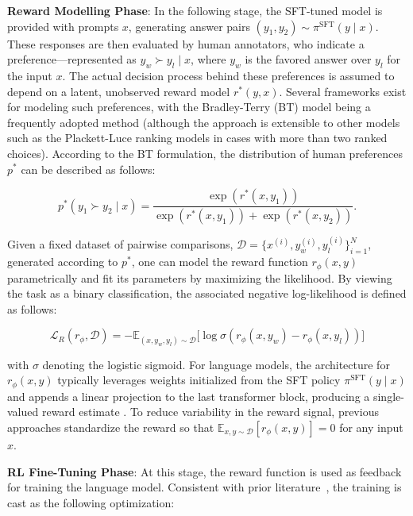 \textbf{Reward Modelling Phase}: In the following stage, the SFT-tuned model is provided with prompts $x$, generating answer pairs $(y_1, y_2)\sim \pi^\text{SFT}(y \mid x)$. These responses are then evaluated by human annotators, who indicate a preference—represented as $y_w\succ y_l \mid x$, where $y_w$ is the favored answer over $y_l$ for the input $x$. The actual decision process behind these preferences is assumed to depend on a latent, unobserved reward model $r^*(y, x)$. Several frameworks exist for modeling such preferences, with the Bradley-Terry (BT) model \cite{bradley1952rankanalysis} being a frequently adopted method (although the approach is extensible to other models such as the Plackett-Luce ranking models \citep{plackett1975analysis, luce2012individual} in cases with more than two ranked choices). According to the BT formulation, the distribution of human preferences $p^*$ can be described as follows:

\begin{equation}\label{eq:bradley-terry}
    p^*(y_1\succ y_2 \mid x)=\frac{\exp\left(r^*(x, y_1)\right)}{\exp\left(r^*(x, y_1)\right) + \exp\left(r^*(x, y_2)\right)}.
\end{equation}

Given a fixed dataset of pairwise comparisons, $\mathcal{D}=\bigl\{x^{(i)}, y_w^{(i)}, y_l^{(i)}\bigr\}_{i=1}^N$, generated according to $p^*$, one can model the reward function $r_{\phi}(x, y)$ parametrically and fit its parameters by maximizing the likelihood. By viewing the task as a binary classification, the associated negative log-likelihood is defined as follows:

\begin{equation}\label{eq:reward_model}
    \mathcal{L}_R(r_{\phi}, \mathcal{D}) = -\mathbb{E}_{(x, y_w, y_l)\sim \mathcal{D}}\bigl[\log \sigma(r_{\phi}(x, y_w)- r_{\phi}(x, y_l))\bigr]
\end{equation}

with $\sigma$ denoting the logistic sigmoid. For language models, the architecture for $r_{\phi}(x, y)$ typically leverages weights initialized from the SFT policy $\pi^\text{SFT}(y \mid x)$ and appends a linear projection to the last transformer block, producing a single-valued reward estimate \cite{ziegler2020finetuning}. To reduce variability in the reward signal, previous approaches standardize the reward so that  $\mathbb{E}_{x,y\sim \mathcal{D}}\left[r_\phi(x, y)\right] = 0$ for any input $x$.

\textbf{RL Fine-Tuning Phase}: At this stage, the reward function is used as feedback for training the language model. Consistent with prior literature~\citep{jaques2017sequence, jaques2020human}, the training is cast as the following optimization:

